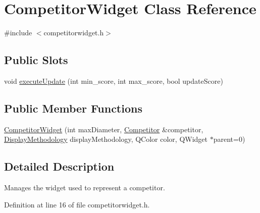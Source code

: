 \hypertarget{class_competitor_widget}{
\section{CompetitorWidget Class Reference}
\label{class_competitor_widget}
}


{\ttfamily \#include $<$competitorwidget.h$>$}

\subsection*{Public Slots}
\begin{DoxyCompactItemize}
\item 
void \hyperlink{class_competitor_widget_a92ca3213de6dd2fa310cb4cd2b709422}{executeUpdate} (int min\_\-score, int max\_\-score, bool updateScore)
\end{DoxyCompactItemize}
\subsection*{Public Member Functions}
\begin{DoxyCompactItemize}
\item 
\hyperlink{class_competitor_widget_ab74c5e087edd81103532188a3d3c6226}{CompetitorWidget} (int maxDiameter, \hyperlink{class_competitor}{Competitor} \&competitor, \hyperlink{guicommon_8h_ab73f4a618a1a86d78e9cc82ff1c376df}{DisplayMethodology} displayMethodology, QColor color, QWidget $\ast$parent=0)
\end{DoxyCompactItemize}


\subsection{Detailed Description}
Manages the widget used to represent a competitor. 

Definition at line 16 of file competitorwidget.h.



